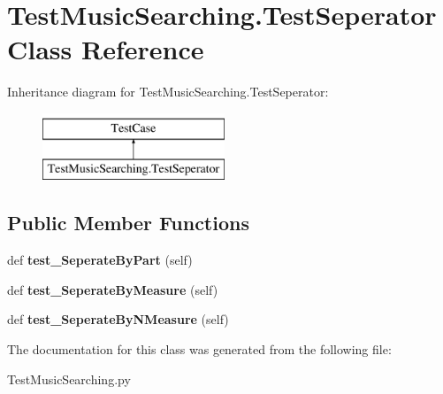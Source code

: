 \hypertarget{class_test_music_searching_1_1_test_seperator}{}\section{Test\+Music\+Searching.\+Test\+Seperator Class Reference}
\label{class_test_music_searching_1_1_test_seperator}
Inheritance diagram for Test\+Music\+Searching.\+Test\+Seperator\+:\begin{figure}[H]
\begin{center}
\leavevmode
\includegraphics[height=2.000000cm]{class_test_music_searching_1_1_test_seperator}
\end{center}
\end{figure}
\subsection*{Public Member Functions}
\begin{DoxyCompactItemize}
\item 
\mbox{\label{class_test_music_searching_1_1_test_seperator_a1ffc8d66e532f85ba827e73603aa40e1}} 
def {\bfseries test\+\_\+\+Seperate\+By\+Part} (self)
\item 
\mbox{\label{class_test_music_searching_1_1_test_seperator_ad0a9181a7b16932ab714ff4d0e212575}} 
def {\bfseries test\+\_\+\+Seperate\+By\+Measure} (self)
\item 
\mbox{\label{class_test_music_searching_1_1_test_seperator_a6f24ecd266e3864cb28de530b6a22826}} 
def {\bfseries test\+\_\+\+Seperate\+By\+N\+Measure} (self)
\end{DoxyCompactItemize}


The documentation for this class was generated from the following file\+:\begin{DoxyCompactItemize}
\item 
Test\+Music\+Searching.\+py\end{DoxyCompactItemize}
